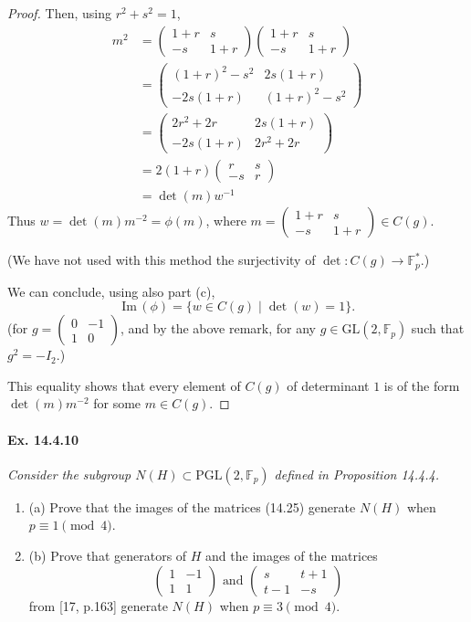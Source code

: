 \documentclass[11pt,a4paper]{article}
\newcommand{\be} {\begin{enumerate}}
\newcommand{\ee} {\end{enumerate}}
\newcommand{\F}{\mathbb{F}}
\newcommand{\im}{\,\mathrm{Im}\,}
\begin{document}
{\begin{proof}
Then, using $r^2+s^2 = 1$,
\begin{align*}
m^2 &= \begin{pmatrix} 1+r & s\\- s & 1+r \end{pmatrix}\begin{pmatrix} 1+r & s\\- s & 1+r \end{pmatrix}\\
&=\begin{pmatrix} (1+r)^2 -s^2 & 2s(1+r)\\- 2s(1+r) & (1+r)^2 -s^2 \end{pmatrix}\\
&=\begin{pmatrix} 2r^2 + 2r & 2s(1+r)\\- 2s(1+r) & 2r^2+2r \end{pmatrix}\\
&=2(1+r) \begin{pmatrix} r & s\\- s & r \end{pmatrix}\\
&= \det(m)w^{-1}
\end{align*}
Thus $w = \det(m) m^{-2} = \phi(m)$, where $m = \begin{pmatrix} 1+r & s\\- s & 1+r \end{pmatrix} \in C(g)$.

(We have not used with this method the surjectivity of $\det : C(g) \to \F_p^*$.)

We can conclude, using also part (c),
$$\im(\phi) = \{w \in C(g) \mid \det(w) = 1\}.$$
(for $g= \begin{pmatrix} 0 & -1\\1 & 0 \end{pmatrix}$, and by the above remark, for any $g \in \mathrm{GL}(2,\F_p)$ such that $g^2 = -I_2$.)

This equality shows that every element of $C(g)$ of determinant $1$ is of the form $\det(m) m^{-2}$ for some $m \in C(g)$.
\end{proof}

\paragraph{Ex. 14.4.10}{\it Consider the subgroup $N(H) \subset \mathrm{PGL}(2,\F_p)$ defined in Proposition 14.4.4.
\be
\item[(a)] Prove that the images of the matrices (14.25) generate $N(H)$ when $p\equiv 1 \pmod 4$.
\item[(b)] Prove that generators of $H$ and the images of the matrices
$$
\begin{pmatrix} 1 & -1\\1 & 1 \end{pmatrix} \text { and } \begin{pmatrix} s &  t+ 1\\ t- 1& -s \end{pmatrix}
$$
from [17, p.163] generate $N(H)$ when $p\equiv 3 \pmod 4$.
\ee
}

}
\end{document}
